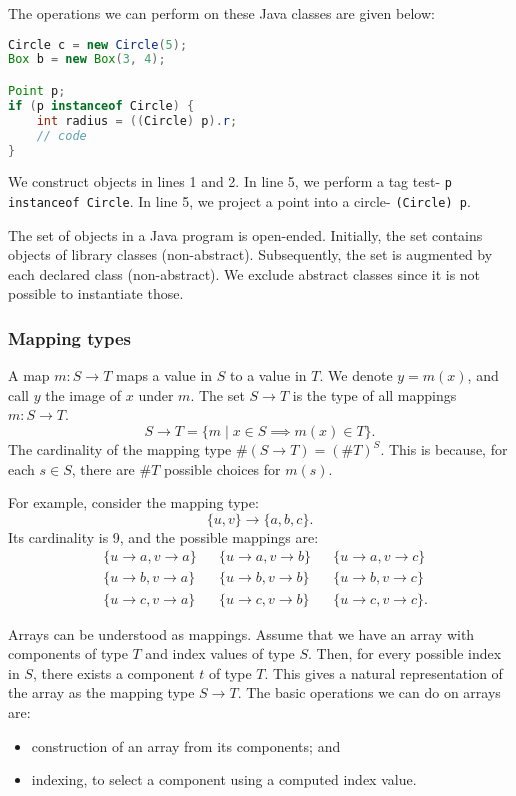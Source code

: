 \documentclass[a4paper, openany]{memoir}
\begin{document}
The operations we can perform on these Java classes are given below:
\begin{lstlisting}[language=java]
Circle c = new Circle(5);
Box b = new Box(3, 4);

Point p;
if (p instanceof Circle) {
    int radius = ((Circle) p).r;
    // code
}
\end{lstlisting}
We construct objects in lines 1 and 2. In line 5, we perform a tag test- \texttt{p instanceof Circle}. In line 5, we project a point into a circle- \texttt{(Circle) p}.

The set of objects in a Java program is open-ended. Initially, the set contains objects of library classes (non-abstract). Subsequently, the set is augmented by each declared class (non-abstract). We exclude abstract classes since it is not possible to instantiate those.

\subsubsection{Mapping types}
A map $m: S \to T$ maps a value in $S$ to a value in $T$. We denote $y = m(x)$, and call $y$ the image of $x$ under $m$. The set $S \to T$ is the type of all mappings $m: S \to T$.
\[S \to T = \{m \mid x \in S \implies m(x) \in T\}.\]
The cardinality of the mapping type $\#(S \to T) = (\#T)^S$. This is because, for each $s \in S$, there are $\# T$ possible choices for $m(s)$.

For example, consider the mapping type:
\[\{u, v\} \to \{a, b, c\}.\]
Its cardinality is 9, and the possible mappings are:
\begin{align*}
    & \{u \to a, v \to a\} && \{u \to a, v \to b\} && \{u \to a, v \to c\} \\
    & \{u \to b, v \to a\} && \{u \to b, v \to b\} && \{u \to b, v \to c\} \\
    & \{u \to c, v \to a\} && \{u \to c, v \to b\} && \{u \to c, v \to c\}.
\end{align*}

Arrays can be understood as mappings. Assume that we have an array with components of type $T$ and index values of type $S$. Then, for every possible index in $S$, there exists a component $t$ of type $T$. This gives a natural representation of the array as the mapping type $S \to T$. The basic operations we can do on arrays are:
\begin{itemize}
    \item construction of an array from its components; and
    \item indexing, to select a component using a computed index value.
\end{itemize}
\end{document}
